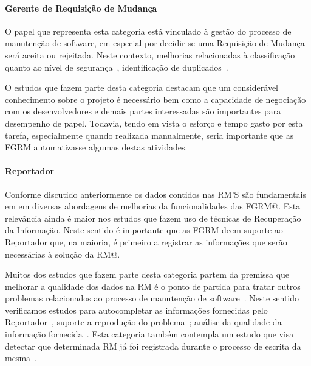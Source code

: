 \paragraph{Gerente de Requisição de	Mudança}
O papel que representa esta categoria está vinculado à gestão do processo de
manutenção de software, em especial por decidir se uma Requisição de Mudança
será aceita ou rejeitada. Neste contexto, melhorias relacionadas à classificação
quanto ao nível de segurança~\cite{gegick2010identifying, zhang2011bug,
	ValdiviaGarcia:2014:CPB:2597073.2597099}, identificação de
duplicados~\cite{hindle2016contextual, sun2010discriminative,
	alipour2013contextual, banerjee2012automated}. 

O estudos que fazem parte desta categoria destacam que um considerável
conhecimento sobre o projeto é necessário bem como  a capacidade de negociação
com os desenvolvedores e demais partes interessadas são importantes para
desempenho de papel. Todavia, tendo em vista o esforço e tempo gasto por esta
tarefa, especialmente quando realizada manualmente, seria importante que as FGRM
automatizasse algumas destas atividades.

\paragraph{Reportador}
Conforme discutido anteriormente os dados contidos nas RM'S são fundamentais em
em diversas abordagens de melhorias da funcionalidades das FGRM@. Esta relevância
ainda é maior nos estudos que fazem uso de técnicas de Recuperação da
Informação. Neste sentido é importante que as FGRM deem suporte ao Reportador
que, na maioria, é primeiro a registrar as informações que serão necessárias à
solução da RM@. 

Muitos dos estudos que fazem parte desta categoria  partem da premissa que
melhorar a qualidade dos dados na RM é o ponto de partida para tratar outros
problemas relacionados ao processo de manutenção de
software~\cite{moran2015auto, Moran:2015:EAA:2786805.2807557, Bettenburg2008a}.
Neste sentido verificamos estudos para autocompletar as informações fornecidas
pelo Reportador~\cite{moran2015auto}, suporte a reprodução do
problema~\cite{Moran:2015:EAA:2786805.2807557}; análise da qualidade da
informação fornecida~\cite{Bettenburg2008a, Tu:2014:MQI:2677832.2677844}. Esta
categoria também contempla um estudo que visa detectar que determinada RM já foi
registrada durante o processo de escrita da mesma~\cite{Thung2014}.
